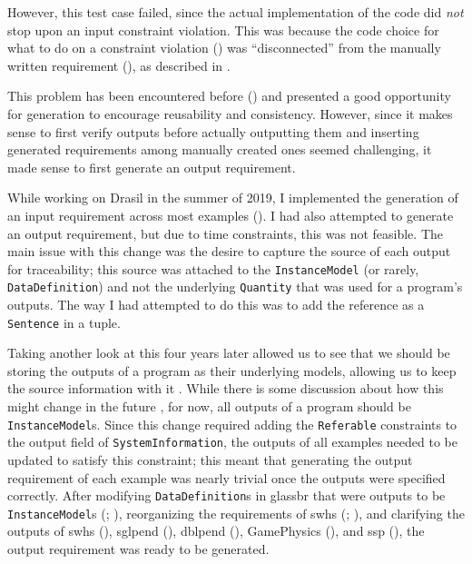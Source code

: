 However, this test case failed,
since the actual implementation of the code did \emph{not} stop upon an input
constraint violation. This was because the code choice for what to do on a
constraint violation () was ``disconnected'' from the
manually written requirement (), as described in
. 

This problem has been encountered before () and presented a good
opportunity for generation to encourage reusability and consistency. However,
since it makes sense to first verify outputs before actually outputting them
and inserting generated requirements among manually created ones seemed
challenging, it made sense to first generate an output requirement.

While working on Drasil in the summer of 2019, I implemented the generation
of an input requirement across most examples ().
I had also attempted to generate an output requirement, but due to time
constraints, this was not feasible. The
main issue with this change was the desire to capture the source of each output
for traceability; this source was attached to the \texttt{InstanceModel}
(or rarely, \texttt{DataDefinition}) and not the underlying \texttt{Quantity}
that was used for a program's outputs. The way I had attempted to do this was
to add the reference as a \texttt{Sentence} in a tuple.

Taking another look at this four years later allowed us to
see that we should be storing the outputs of a program as their underlying
models, allowing us to keep the source information with it
. While there is some discussion about how this might
change in the future , for now, all outputs of a program should be
\texttt{InstanceModel}s. Since this change required adding the
\texttt{Referable}  constraints to the output field of
\texttt{SystemInformation}, the outputs of all examples needed to be updated to
satisfy this constraint; this meant that generating the output requirement of
each example was nearly trivial once the outputs were specified correctly.
After modifying \texttt{DataDefinition}s in \acs{glassbr} that were outputs to be
\texttt{InstanceModel}s (; ), reorganizing the
requirements of \acs{swhs} (; ), and clarifying the
outputs of \acs{swhs} (), \acs{sglpend} (),
\acs{dblpend} (), GamePhysics (), and
\acs{ssp} (), the output requirement was ready to be generated.
